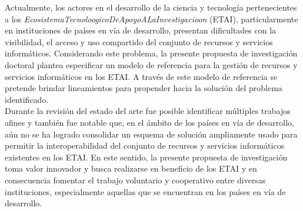 



Actualmente, los actores en el desarrollo de la ciencia y tecnología pertenecientes a los \textit{\gls{EcosistemaTecnoloogicoDeApoyoALaInvestigacioon}} (\acrshort{ETAI}), particularmente en instituciones de países en vía de desarrollo, presentan dificultades con la visibilidad, el acceso y uso compartido del conjunto de recursos y servicios informáticos. Considerando este problema, la presente propuesta de investigación doctoral plantea especificar un modelo de referencia para la gestión de recursos y servicios informáticos en los \acrshort{ETAI}. A través de este modelo de referencia se pretende brindar lineamientos para propender hacia la solución del problema identificado.\\

Durante la revisión del estado del arte fue posible identificar múltiples trabajos afines y también fue notable que, en el ámbito de los países en vía de desarrollo, aún no se ha logrado consolidar un esquema de solución ampliamente usado para permitir la interoperabilidad del conjunto de recursos y servicios informáticos existentes en los \acrshort{ETAI}. En este sentido, la presente propuesta de investigación toma valor innovador y busca realizarse en beneficio de los \acrshort{ETAI} y en consecuencia fomentar el trabajo voluntario y cooperativo entre diversas instituciones, especialmente aquellas que se encuentran en los países en vía de desarrollo.\\

